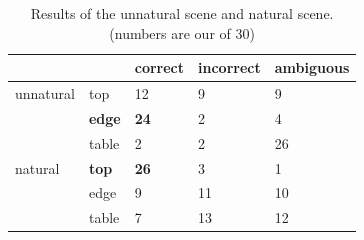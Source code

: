 
\begin{table}[H]
\label{tab:naturaltrial}
\begin{tabular}{lllll}
          &               & correct     & incorrect & ambiguous \\ \hline
unnatural & top           & 12          & 9         & 9         \\
          & \textbf{edge} & \textbf{24} & 2         & 4         \\
          & table         & 2           & 2         & 26        \\ \hline
natural   & \textbf{top}  & \textbf{26} & 3         & 1         \\
          & edge          & 9           & 11        & 10        \\
          & table         & 7           & 13        & 12        \\ \hline
\end{tabular}
\caption{Results of the unnatural scene and natural scene. (numbers are our of 30) }
\label{tab:natural-unnatural}
\end{table}


